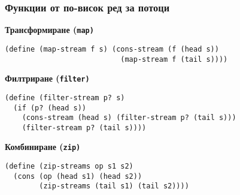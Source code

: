 \documentclass{beamer}
\begin{document}
\begin{frame}[fragile]
  \frametitle{Функции от по-висок ред за потоци}

  \textbf{Трансформиране (\tt{map})}
\begin{lstlisting}
(define (map-stream f s) (cons-stream (f (head s))
                           (map-stream f (tail s))))
\end{lstlisting}
  \pause
  \textbf{Филтриране (\tt{filter})}
\begin{lstlisting}
(define (filter-stream p? s)
  (if (p? (head s))
    (cons-stream (head s) (filter-stream p? (tail s)))
    (filter-stream p? (tail s))))
\end{lstlisting}
  \pause
  \textbf{Комбиниране (\tt{zip})}
\begin{lstlisting}
(define (zip-streams op s1 s2)
  (cons (op (head s1) (head s2))
        (zip-streams (tail s1) (tail s2))))
\end{lstlisting}
\end{frame}
\end{document}
